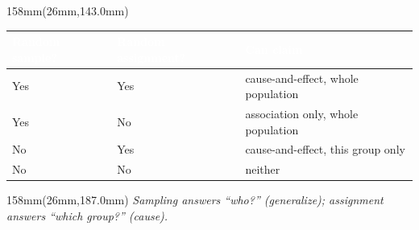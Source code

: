\documentclass[a4paper]{article}
\begin{document}
\begin{textblock*}{158mm}(26mm,143.0mm)
{\fontsize{11}{14}\selectfont
\begin{tabular}{|>{\centering\arraybackslash}p{30mm}|>{\centering\arraybackslash}p{40mm}|p{58mm}|}
\hline
\cellcolor{accent}\textcolor{white}{\textbf{Random sample?}} & \cellcolor{accent}\textcolor{white}{\textbf{Random assignment?}} & \cellcolor{accent}\textcolor{white}{\textbf{Can claim}} \\ \hline
Yes & Yes & cause-and-effect, whole population \\ \hline
Yes & No & association only, whole population \\ \hline
No & Yes & cause-and-effect, this group only \\ \hline
No & No & neither \\ \hline
\end{tabular}}
\end{textblock*}

\begin{textblock*}{158mm}(26mm,187.0mm)
{\fontsize{10}{13}\selectfont\color{black!55}\itshape Sampling answers ``who?'' (generalize); assignment answers ``which group?'' (cause).}
\end{textblock*}
\end{document}

